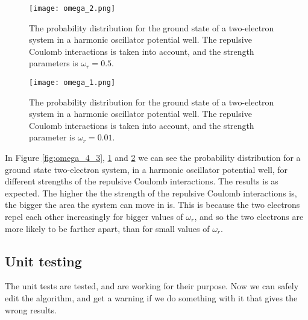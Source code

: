 \documentclass[12pt]{article}
\begin{document}
\begin{flushleft}
\begin{figure}[h!]
\begin{center}
\texttt{[image: omega\_2.png]}
\caption{\label{fig:omega_2}The probability distribution for the ground state of a two-electron system in a harmonic oscillator potential well. The repulsive Coulomb interactions is taken into account, and the strength parameters is $\omega_r = 0.5$.}
\end{center}
\end{figure}
\newpage
\begin{figure}[h!]
\begin{center}
\texttt{[image: omega\_1.png]}
\caption{\label{fig:omega_1}The probability distribution for the ground state of a two-electron system in a harmonic oscillator potential well. The repulsive Coulomb interactions is taken into account, and the strength parameter is $\omega_r = 0.01$.}
\end{center}
\end{figure}

In Figure \ref{fig:omega_4_3}, \ref{fig:omega_2} and \ref{fig:omega_1} we can see the probability distribution for a ground state two-electron system, in a harmonic oscillator potential well, for different strengths of the repulsive Coulomb interactions. The results is as expected. The higher the the strength of the repulsive Coulomb interactions is, the bigger the area the system can move in is. This is because the two electrons repel each other increasingly for bigger values of $\omega_r$, and so the two electrons are more likely to be farther apart, than for small values of $\omega_r$.

\subsection{Unit testing}
The unit tests are tested, and are working for their purpose. Now we can safely edit the algorithm, and get a warning if we do something with it that gives the wrong results.

\end{flushleft}
\end{document}
